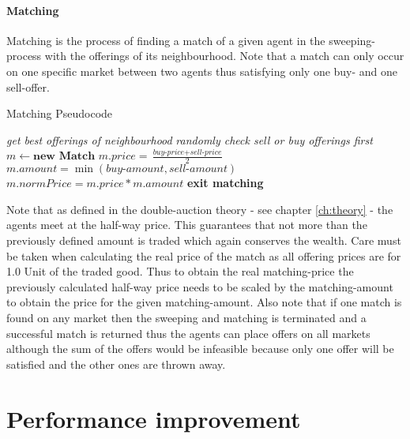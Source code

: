 \documentclass[Bachelorarbeit.tex]{subfiles}
\begin{document}
\paragraph{Matching}
Matching is the process of finding a match of a given agent in the sweeping-process with the offerings of its neighbourhood. Note that a match can only occur on one specific market between two agents thus satisfying only one buy- and one sell-offer.

\begin{algorithm}
\caption{Matching Pseudocode}
\begin{algorithmic}[1]
\State \textit{get best offerings of neighbourhood}
	\State \textit{randomly check sell or buy offerings first}
		\State $m \gets \textbf{new Match}$
		\State $m.price = \frac{\textit{buy-price} + \textit{sell-price}}{2}$
		\State $m.amount = \min(\textit{buy-amount}, \textit{sell-amount})$
		\State $m.normPrice = m.price * m.amount$
		\State \textbf{exit matching}
	\EndIf
\EndFor
\end{algorithmic}
\end{algorithm}

Note that as defined in the double-auction theory - see chapter \ref{ch:theory} - the agents meet at the half-way price. This guarantees that not more than the previously defined amount is traded which again conserves the wealth. Care must be taken when calculating the real price of the match as all offering prices are for 1.0 Unit of the traded good. Thus to obtain the real matching-price the previously calculated half-way price needs to be scaled by the matching-amount to obtain the price for the given matching-amount.
\medskip
Also note that if one match is found on any market then the sweeping and matching is terminated and a successful match is returned thus the agents can place offers on all markets although the sum of the offers would be infeasible because only one offer will be satisfied and the other ones are thrown away.

\section{Performance improvement}
\label{sec:implementation_performanceImprovement}
\end{document}
